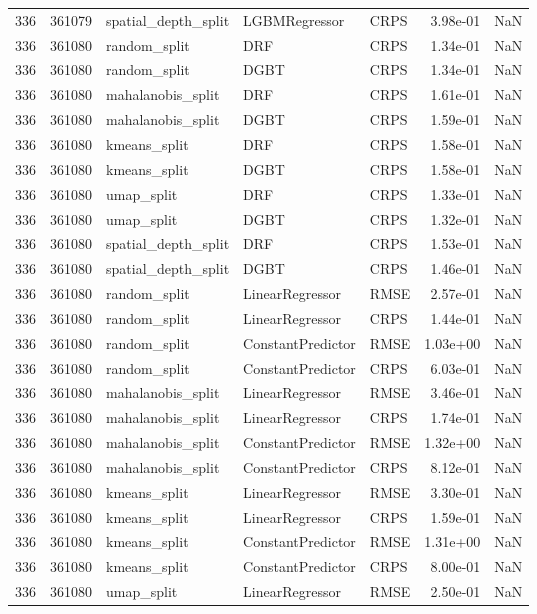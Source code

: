 \begin{tabular}{rrlllrr}
336 & 361079 & spatial\_depth\_split & LGBMRegressor & CRPS & 3.98e-01 & NaN \\
336 & 361080 & random\_split & DRF & CRPS & 1.34e-01 & NaN \\
336 & 361080 & random\_split & DGBT & CRPS & 1.34e-01 & NaN \\
336 & 361080 & mahalanobis\_split & DRF & CRPS & 1.61e-01 & NaN \\
336 & 361080 & mahalanobis\_split & DGBT & CRPS & 1.59e-01 & NaN \\
336 & 361080 & kmeans\_split & DRF & CRPS & 1.58e-01 & NaN \\
336 & 361080 & kmeans\_split & DGBT & CRPS & 1.58e-01 & NaN \\
336 & 361080 & umap\_split & DRF & CRPS & 1.33e-01 & NaN \\
336 & 361080 & umap\_split & DGBT & CRPS & 1.32e-01 & NaN \\
336 & 361080 & spatial\_depth\_split & DRF & CRPS & 1.53e-01 & NaN \\
336 & 361080 & spatial\_depth\_split & DGBT & CRPS & 1.46e-01 & NaN \\
336 & 361080 & random\_split & LinearRegressor & RMSE & 2.57e-01 & NaN \\
336 & 361080 & random\_split & LinearRegressor & CRPS & 1.44e-01 & NaN \\
336 & 361080 & random\_split & ConstantPredictor & RMSE & 1.03e+00 & NaN \\
336 & 361080 & random\_split & ConstantPredictor & CRPS & 6.03e-01 & NaN \\
336 & 361080 & mahalanobis\_split & LinearRegressor & RMSE & 3.46e-01 & NaN \\
336 & 361080 & mahalanobis\_split & LinearRegressor & CRPS & 1.74e-01 & NaN \\
336 & 361080 & mahalanobis\_split & ConstantPredictor & RMSE & 1.32e+00 & NaN \\
336 & 361080 & mahalanobis\_split & ConstantPredictor & CRPS & 8.12e-01 & NaN \\
336 & 361080 & kmeans\_split & LinearRegressor & RMSE & 3.30e-01 & NaN \\
336 & 361080 & kmeans\_split & LinearRegressor & CRPS & 1.59e-01 & NaN \\
336 & 361080 & kmeans\_split & ConstantPredictor & RMSE & 1.31e+00 & NaN \\
336 & 361080 & kmeans\_split & ConstantPredictor & CRPS & 8.00e-01 & NaN \\
336 & 361080 & umap\_split & LinearRegressor & RMSE & 2.50e-01 & NaN \\

\end{tabular}
